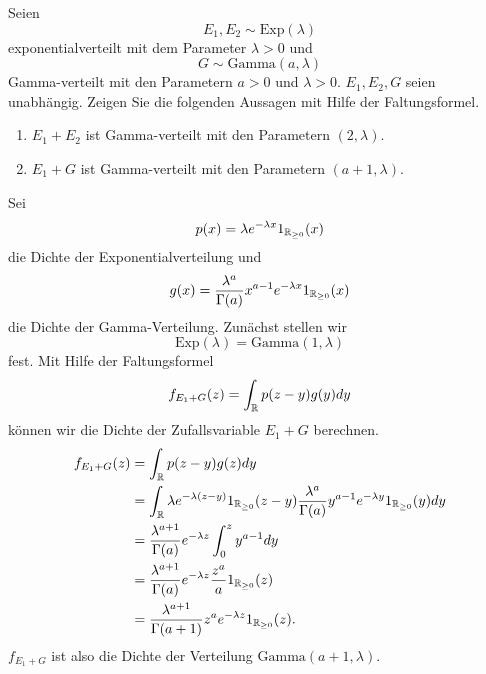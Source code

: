 Seien
\begin{equation*}
    E_1, E_2 \sim \text{Exp}(\lambda)
\end{equation*}
exponentialverteilt mit dem Parameter
$\lambda>0$ und
\begin{equation*}
    G \sim \text{Gamma}(a,\lambda)
\end{equation*}
Gamma-verteilt mit den Parametern $a>0$ und $\lambda>0$. $E_1, E_2, G$ seien
unabhängig. Zeigen Sie die folgenden Aussagen mit Hilfe der Faltungsformel.
\begin{enumerate}
    \item $E_1 + E_2$ ist Gamma-verteilt mit den Parametern $(2,\lambda)$. 
    \item $E_1 + G$ ist Gamma-verteilt mit den Parametern $(a+1, \lambda)$. 
\end{enumerate}
\solution
Sei 
\begin{equation*}
    p(x) = \lambda e^{- \lambda x} 1_{\mathbb R_{\geq 0}}(x)
\end{equation*}
die Dichte der Exponentialverteilung und 
\begin{equation*}
    g(x) = \frac{\lambda^a}{\Gamma(a)} x^{a-1} e^{-\lambda x} 1_{\mathbb R_{\geq 0}}(x)
\end{equation*}
die Dichte der Gamma-Verteilung. Zunächst stellen wir
\begin{equation*}
    \text{Exp}(\lambda) = \text{Gamma}(1, \lambda)
\end{equation*}
fest. Mit Hilfe der Faltungsformel
\begin{equation*}
    f_{E_1 + G}(z) = \int_{\mathbb R}^{} p(z-y) g(y) dy
\end{equation*}
können wir die Dichte der Zufallsvariable $E_1 + G$ berechnen.
\begin{align*}
    f_{E_1 + G} (z) &= \int_{\mathbb R}^{} p(z-y) g(z) dy \\
    &= \int_{\mathbb R}^{} \lambda e^{-\lambda (z-y)} 1_{\mathbb R_{\geq 0}} (z-y)
    \frac{\lambda^a}{\Gamma(a)} y^{a-1} e^{- \lambda y } 1_{\mathbb R_{\geq 0}}(y) dy \\
    &= \frac{\lambda^{a+1}}{\Gamma(a)} e^{-\lambda z} \int_{0}^{z} y^{a-1} dy \\
    &= \frac{\lambda^{a+1}}{\Gamma(a)} e^{-\lambda z} \frac{z^a}{a} 1_{\mathbb R_{\geq 0}} (z) \\
    &=  \frac{\lambda^{a+1}}{\Gamma(a+1)} z^{a} e^{-\lambda z} 1_{\mathbb R_{\geq 0}} (z).
\end{align*}
$f_{E_1 + G}$ ist also die Dichte der Verteilung $\text{Gamma}(a+1, \lambda)$. 


